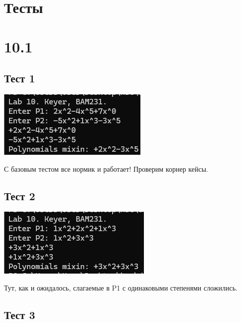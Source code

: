 \documentclass[12pt]{article}
\begin{document}
	\section{Тесты}
	
	\section{10.1}
	
	\subsection{Тест 1}

	\includegraphics[width=\linewidth]{images/test1}
	
	С базовым тестом все нормик и работает! Проверим корнер кейсы.
	
		
	\subsection{Тест 2}
	
	\includegraphics[width=\linewidth]{images/test2}
	
	Тут, как и ожидалось, слагаемые в P1 с одинаковыми степенями сложились.
	
	\subsection{Тест 3}
	
\end{document}

